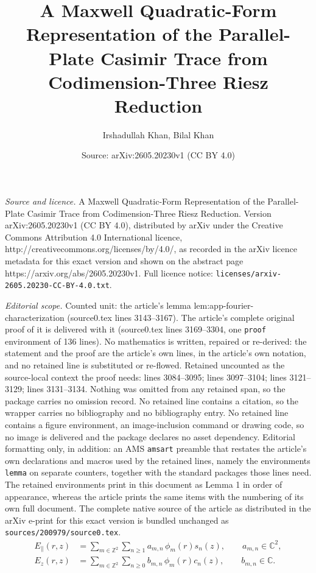 \documentclass[10pt,a4paper]{amsart}
\title{A Maxwell Quadratic-Form Representation of the Parallel-Plate Casimir Trace from Codimension-Three Riesz Reduction}
\author{Irshadullah Khan, Bilal Khan}
\date{Source: arXiv:2605.20230v1 (CC BY 4.0)}
\providecommand{\C}{\mathbb{C}}
\providecommand{\Z}{\mathbb{Z}}
\begin{document}
\maketitle

\noindent\emph{Source and licence.} A Maxwell Quadratic-Form Representation of the Parallel-Plate Casimir Trace from Codimension-Three Riesz Reduction. Version arXiv:2605.20230v1 (CC BY 4.0), distributed by arXiv under the Creative Commons Attribution 4.0 International licence, http://creativecommons.org/licenses/by/4.0/, as recorded in the arXiv licence metadata for this exact version and shown on the abstract page https://arxiv.org/abs/2605.20230v1. Full licence notice: \texttt{licenses/arxiv-2605.20230-CC-BY-4.0.txt}.\par\smallskip

\noindent\textit{Editorial scope.} Counted unit: the article's lemma lem:app-fourier-characterization (source0.tex lines 3143--3167). The article's complete original proof of it is delivered with it (source0.tex lines 3169--3304, one \texttt{proof} environment of 136 lines). No mathematics is written, repaired or re-derived: the statement and the proof are the article's own lines, in the article's own notation, and no retained line is substituted or re-flowed.  Retained uncounted as the source-local context the proof needs: lines 3084--3095; lines 3097--3104; lines 3121--3129; lines 3131--3134.  Nothing was omitted from any retained span, so the package carries no omission record.  No retained line contains a citation, so the wrapper carries no bibliography and no bibliography entry.  No retained line contains a figure environment, an image-inclusion command or drawing code, so no image is delivered and the package declares no asset dependency.  Editorial formatting only, in addition: an AMS \texttt{amsart} preamble that restates the article's own declarations and macros used by the retained lines, namely the environments \texttt{lemma} on separate counters, together with the standard packages those lines need.  The retained environments print in this document as Lemma 1 in order of appearance, whereas the article prints the same items with the numbering of its own full document.  The complete native source of the article as distributed in the arXiv e-print for this exact version is bundled unchanged as \texttt{sources/200979/source0.tex}.
\begin{align}
    E_{\parallel}(r,z)
    &=
    \sum_{m\in\Z^2}\sum_{n\ge1}
    a_{m,n}\,\phi_m(r)s_n(z),
    \qquad a_{m,n}\in\C^2,                                  \label{eq:app-mixed-tangential}\\
    E_z(r,z)
    &=
    \sum_{m\in\Z^2}\sum_{n\ge0}
    b_{m,n}\,\phi_m(r)c_n(z),
    \qquad b_{m,n}\in\C .                                     \label{eq:app-mixed-normal}
\end{align}
\end{document}

